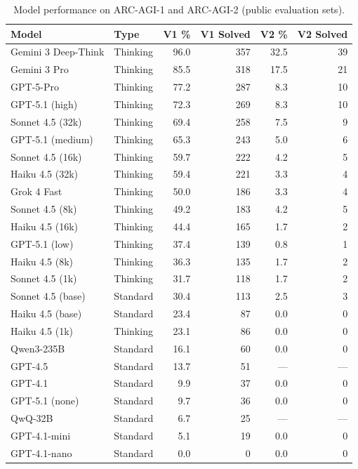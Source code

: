 \documentclass[11pt, letterpaper]{article}
\begin{document}
\begin{table}[H]
\centering
\caption{Model performance on ARC-AGI-1 and ARC-AGI-2 (public evaluation sets).}
\label{tab:leaderboard}
\small
\begin{tabular}{llrrrr}
\toprule
\textbf{Model} & \textbf{Type} & \textbf{V1 \%} & \textbf{V1 Solved} & \textbf{V2 \%} & \textbf{V2 Solved} \\
\midrule
Gemini 3 Deep-Think  & Thinking & 96.0 & 357 & 32.5 & 39 \\
Gemini 3 Pro         & Thinking & 85.5 & 318 & 17.5 & 21 \\
GPT-5-Pro            & Thinking & 77.2 & 287 & 8.3  & 10 \\
GPT-5.1 (high)       & Thinking & 72.3 & 269 & 8.3  & 10 \\
Sonnet 4.5 (32k)     & Thinking & 69.4 & 258 & 7.5  & 9  \\
GPT-5.1 (medium)     & Thinking & 65.3 & 243 & 5.0  & 6  \\
Sonnet 4.5 (16k)     & Thinking & 59.7 & 222 & 4.2  & 5  \\
Haiku 4.5 (32k)      & Thinking & 59.4 & 221 & 3.3  & 4  \\
Grok 4 Fast          & Thinking & 50.0 & 186 & 3.3  & 4  \\
Sonnet 4.5 (8k)      & Thinking & 49.2 & 183 & 4.2  & 5  \\
Haiku 4.5 (16k)      & Thinking & 44.4 & 165 & 1.7  & 2  \\
GPT-5.1 (low)        & Thinking & 37.4 & 139 & 0.8  & 1  \\
Haiku 4.5 (8k)       & Thinking & 36.3 & 135 & 1.7  & 2  \\
Sonnet 4.5 (1k)      & Thinking & 31.7 & 118 & 1.7  & 2  \\
Sonnet 4.5 (base)    & Standard & 30.4 & 113 & 2.5  & 3  \\
Haiku 4.5 (base)     & Standard & 23.4 & 87  & 0.0  & 0  \\
Haiku 4.5 (1k)       & Thinking & 23.1 & 86  & 0.0  & 0  \\
Qwen3-235B           & Standard & 16.1 & 60  & 0.0  & 0  \\
GPT-4.5              & Standard & 13.7 & 51  & ---  & ---\\
GPT-4.1              & Standard &  9.9 & 37  & 0.0  & 0  \\
GPT-5.1 (none)       & Standard &  9.7 & 36  & 0.0  & 0  \\
QwQ-32B              & Standard &  6.7 & 25  & ---  & ---\\
GPT-4.1-mini         & Standard &  5.1 & 19  & 0.0  & 0  \\
GPT-4.1-nano         & Standard &  0.0 &  0  & 0.0  & 0  \\
\bottomrule
\end{tabular}
\end{table}
\end{document}
